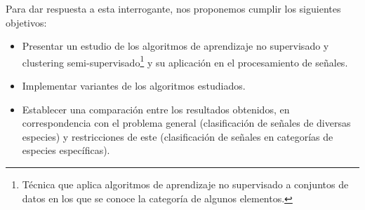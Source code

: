 Para dar respuesta a esta interrogante, nos proponemos cumplir los siguientes objetivos:
\begin{itemize}
    \item Presentar un estudio de los algoritmos de aprendizaje no supervisado y clustering semi-supervisado\footnote{Técnica que aplica algoritmos de aprendizaje no supervisado a conjuntos de datos en los que se conoce la categoría de algunos elementos.} y su aplicación en el procesamiento de señales.
    \item Implementar variantes de los algoritmos estudiados.
    \item Establecer una comparación entre los resultados obtenidos, en correspondencia con el problema general (clasificación de señales de diversas especies) y restricciones de este (clasificación de señales en categorías de especies específicas).
\end{itemize}